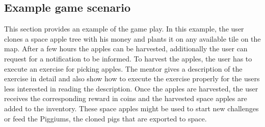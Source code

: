 \subsection{Example game scenario}
This section provides an example of the game play. In this example, the user clones a space apple tree with his money and plants it on any available tile on the map. After a few hours the apples can be harvested, additionally the user can request for a notification to be informed. To harvest the apples, the user has to execute an exercise for picking apples. The mentor gives a description of the exercise in detail and also show how to execute the exercise properly for the users less interested in reading the description. Once the apples are harvested, the user receives the corresponding reward in coins and the harvested space apples are added to the inventory. These space apples might be used to start new challenges or feed the Piggiums, the cloned pigs that are exported to space.

